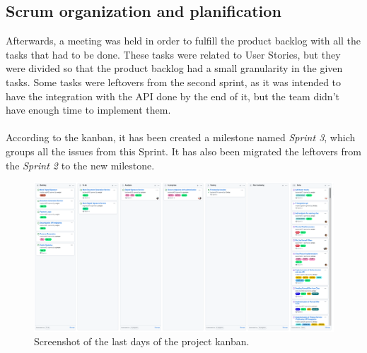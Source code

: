 \documentclass[./main.tex]{subfiles}
\begin{document}
\subsection{Scrum organization and planification}
Afterwards, a meeting was held in order to fulfill the product backlog
with all the tasks that had to be done. These tasks were related to User
Stories, but they were divided so that the product backlog had a small
granularity in the given tasks. Some tasks were leftovers from the second sprint, as 
it was intended to have the integration with the API done by the end of it, but 
the team didn't have enough time to implement them.
\\
\\
According to the kanban, it has been created a milestone named \textit{Sprint  3}, which groups all the issues from this Sprint. It has also been migrated the leftovers from the \textit{Sprint 2} to the new milestone.
\begin{figure}[H]
	\includegraphics[width=15cm]{img/kanban.png}
	\caption{Screenshot of the last days of the project kanban.}
\end{figure}
\end{document}
